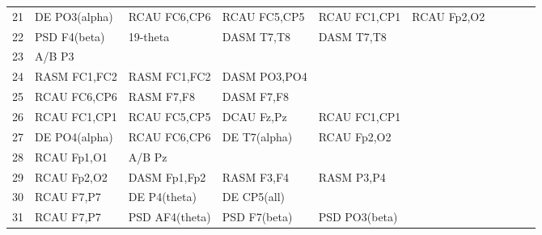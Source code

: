 \begin{landscape}
\begin{table}[]
\begin{tabular}{l|llllllll}
21       & DE PO3(alpha)  & RCAU FC6,CP6   & RCAU FC5,CP5   & RCAU FC1,CP1   & RCAU Fp2,O2    &                &                &                &               &              \\
22       & PSD F4(beta)   & 19-theta       & DASM T7,T8     & DASM T7,T8     &                &                &                &                &               &              \\
23       & A/B P3         &                &                &                &                &                &                &                &               &              \\
24       & RASM FC1,FC2   & RASM FC1,FC2   & DASM PO3,PO4   &                &                &                &                &                &               &              \\
25       & RCAU FC6,CP6   & RASM F7,F8     & DASM F7,F8     &                &                &                &                &                &               &              \\
26       & RCAU FC1,CP1   & RCAU FC5,CP5   & DCAU Fz,Pz     & RCAU FC1,CP1   &                &                &                &                &               &              \\
27       & DE PO4(alpha)  & RCAU FC6,CP6   & DE T7(alpha)   & RCAU Fp2,O2    &                &                &                &                &               &              \\
28       & RCAU Fp1,O1    & A/B Pz         &                &                &                &                &                &                &               &              \\
29       & RCAU Fp2,O2    & DASM Fp1,Fp2   & RASM F3,F4     & RASM P3,P4     &                &                &                &                &               &              \\
30       & RCAU F7,P7     & DE P4(theta)   & DE CP5(all)    &                &                &                &                &                &               &              \\
31       & RCAU F7,P7     & PSD AF4(theta) & PSD F7(beta)   & PSD PO3(beta)  &                &                &                &                &               &              \\
\end{tabular}
\end{table}
\end{landscape}
\clearpage
